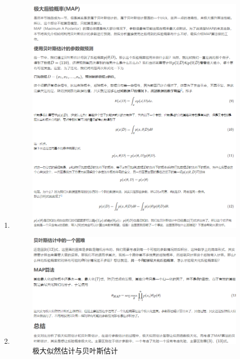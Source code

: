 \documentclass[12pt]{ctexart}%
\begin{document}
\begin{enumerate}
			\item[] 
				\begin{figure}[H]
					\vspace{-0.2cm}  %
					\centering
					\includegraphics[scale=0.8]{derivation_MAP.png}
					\renewcommand{\figurename}{Fig} %
				\end{figure}
			
			\item[] 
				\begin{figure}[H]	
					\vspace{-0.2cm}  %
					\centering
					\includegraphics[scale=0.8]{conclusion_MLE_and_Bayes.png}
					\renewcommand{\figurename}{Fig} %
					\caption{极大似然估计与贝叶斯估计}
					\label{fig:blob}
				\end{figure}	
		\end{enumerate}		
			
\end{document}
